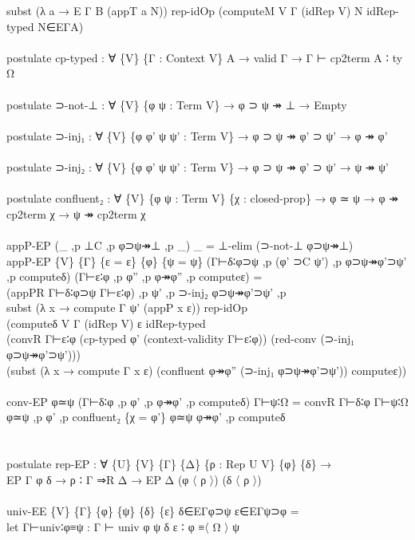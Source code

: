 {\begin{code}
{\>  subst (λ a → E Γ B (appT a N)) rep-idOp (computeM V Γ (idRep V) N idRep-typed N∈EΓA)\<\\
\>\<\\
\>postulate cp-typed : ∀ \{V\} \{Γ : Context V\} A → valid Γ → Γ ⊢ cp2term A ∶ ty Ω\<\\
\>\<\\
\>postulate ⊃-not-⊥ : ∀ \{V\} \{φ ψ : Term V\} → φ ⊃ ψ ↠ ⊥ → Empty\<\\
\>\<\\
\>postulate ⊃-inj₁ : ∀ \{V\} \{φ φ' ψ ψ' : Term V\} → φ ⊃ ψ ↠ φ' ⊃ ψ' → φ ↠ φ'\<\\
\>\<\\
\>postulate ⊃-inj₂ : ∀ \{V\} \{φ φ' ψ ψ' : Term V\} → φ ⊃ ψ ↠ φ' ⊃ ψ' → ψ ↠ ψ'\<\\
\>\<\\
\>postulate confluent₂ : ∀ \{V\} \{φ ψ : Term V\} \{χ : closed-prop\} → φ ≃ ψ → φ ↠ cp2term χ → ψ ↠ cp2term χ\<\\
\>\<\\
\>appP-EP (\_ ,p ⊥C ,p φ⊃ψ↠⊥ ,p \_) \_ = ⊥-elim (⊃-not-⊥ φ⊃ψ↠⊥)\<\\
\>appP-EP \{V\} \{Γ\} \{ε = ε\} \{φ\} \{ψ = ψ\} (Γ⊢δ∶φ⊃ψ ,p (φ' ⊃C ψ') ,p φ⊃ψ↠φ'⊃ψ' ,p computeδ) (Γ⊢ε∶φ ,p φ'' ,p φ↠φ'' ,p computeε) = \<\\
\>  (appPR Γ⊢δ∶φ⊃ψ Γ⊢ε∶φ) ,p ψ' ,p ⊃-inj₂ φ⊃ψ↠φ'⊃ψ' ,p \<\\
\>  subst (λ x → compute Γ ψ' (appP x ε)) rep-idOp \<\\
\>  (computeδ V Γ (idRep V) ε idRep-typed \<\\
\>    (convR Γ⊢ε∶φ (cp-typed φ' (context-validity Γ⊢ε∶φ)) (red-conv (⊃-inj₁ φ⊃ψ↠φ'⊃ψ')))\<\\
\>  (subst (λ x → compute Γ x ε) (confluent φ↠φ'' (⊃-inj₁ φ⊃ψ↠φ'⊃ψ')) computeε))\<\\
\>\<\\
\>conv-EP φ≃ψ (Γ⊢δ∶φ ,p φ' ,p φ↠φ' ,p computeδ) Γ⊢ψ∶Ω = convR Γ⊢δ∶φ Γ⊢ψ∶Ω φ≃ψ ,p φ' ,p confluent₂ \{χ = φ'\} φ≃ψ φ↠φ' ,p computeδ\<\\
\>\<\\
\>\<\\
\>postulate rep-EP : ∀ \{U\} \{V\} \{Γ\} \{Δ\} \{ρ : Rep U V\} \{φ\} \{δ\} →\<\\
\>                 EP Γ φ δ → ρ ∶ Γ ⇒R Δ → EP Δ (φ 〈 ρ 〉) (δ 〈 ρ 〉)\<\\
\>\<\\
\>univ-EE \{V\} \{Γ\} \{φ\} \{ψ\} \{δ\} \{ε\} δ∈EΓφ⊃ψ ε∈EΓψ⊃φ = \<\\
\>  let Γ⊢univ∶φ≡ψ : Γ ⊢ univ φ ψ δ ε ∶ φ ≡〈 Ω 〉 ψ\<\\
}
\end{code}}

